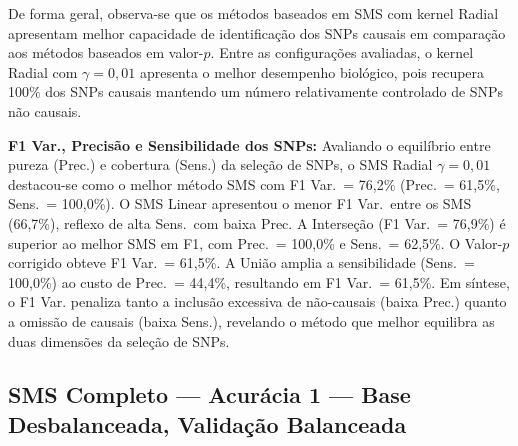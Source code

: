 \documentclass[12pt,a4paper]{article}
\newcommand{\novo}[1]{\textcolor{corNova}{#1}}
\begin{document}
De forma geral, observa-se que os métodos baseados em SMS com kernel Radial apresentam melhor capacidade de identificação dos SNPs causais em comparação aos métodos baseados em valor-$p$. Entre as configurações avaliadas, o kernel Radial com $\gamma = 0{,}01$ apresenta o melhor desempenho biológico, pois recupera 100\% dos SNPs causais mantendo um número relativamente controlado de SNPs não causais.


\novo{\textbf{F1 Var., Precisão e Sensibilidade dos SNPs:} Avaliando o equilíbrio entre pureza (Prec.) e cobertura (Sens.) da seleção de SNPs, o SMS Radial $\gamma=0{,}01$ destacou-se como o melhor método SMS com F1 Var.\ = 76,2\% (Prec.\ = 61,5\%, Sens.\ = 100,0\%). O SMS Linear apresentou o menor F1 Var.\ entre os SMS (66,7\%), reflexo de alta Sens.\ com baixa Prec. A Interseção (F1 Var.\ = 76,9\%) é superior ao melhor SMS em F1, com Prec.\ = 100,0\% e Sens.\ = 62,5\%. O Valor-$p$ corrigido obteve F1 Var.\ = 61,5\%. A União amplia a sensibilidade (Sens.\ = 100,0\%) ao custo de Prec.\ = 44,4\%, resultando em F1 Var.\ = 61,5\%. Em síntese, o F1 Var. penaliza tanto a inclusão excessiva de não-causais (baixa Prec.) quanto a omissão de causais (baixa Sens.), revelando o método que melhor equilibra as duas dimensões da seleção de SNPs.}
\subsection{SMS Completo --- Acurácia 1 --- Base Desbalanceada, Validação Balanceada}
\end{document}
